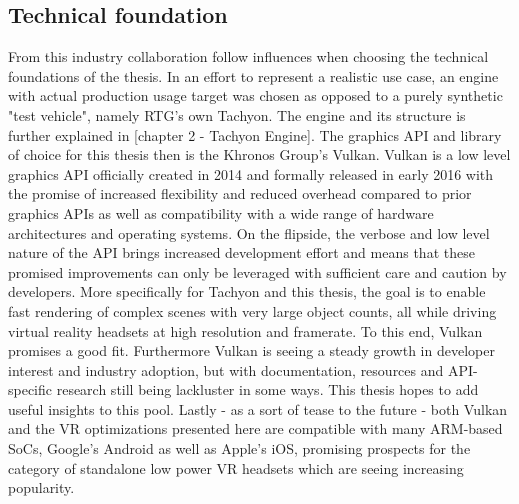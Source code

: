 \subsection{Technical foundation}
From this industry collaboration follow influences when choosing the technical foundations of the thesis. In an effort to represent a realistic use case, an engine with actual production usage target was chosen as opposed to a purely synthetic "test vehicle", namely RTG's own Tachyon. The engine and its structure is further explained in [chapter 2 - Tachyon Engine]. 
The graphics API and library of choice for this thesis then is the Khronos Group's Vulkan. Vulkan is a low level graphics API officially created in 2014 and formally released in early 2016 with the promise of increased flexibility and reduced overhead compared to prior graphics APIs as well as compatibility with a wide range of hardware architectures and operating systems. On the flipside, the verbose and low level nature of the API brings increased development effort and means that these promised improvements can only be leveraged with sufficient care and caution by developers. 
More specifically for Tachyon and this thesis, the goal is to enable fast rendering of complex scenes with very large object counts, all while driving virtual reality headsets at high resolution and framerate. To this end, Vulkan promises a good fit. Furthermore Vulkan is seeing a steady growth in developer interest and industry adoption, but with documentation, resources and API-specific research still being lackluster in some ways. This thesis hopes to add useful insights to this pool. 
Lastly - as a sort of tease to the future - both Vulkan and the VR optimizations presented here are compatible with many ARM-based SoCs, Google's Android as well as Apple's iOS, promising prospects for the category of standalone low power VR headsets which are seeing increasing popularity. 

